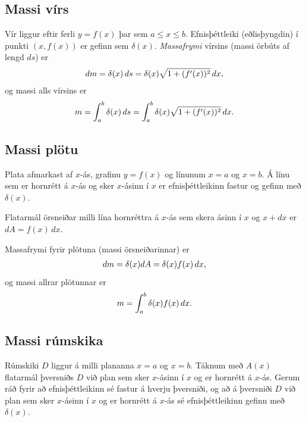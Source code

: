\documentclass[a4paper,10pt,icelandic]{sphinxmanual}
\begin{document}
\subsection{Massi vírs}
\label{kafli07:massi-virs}\label{kafli07:index-10}
Vír liggur eftir ferli \(y=f(x)\) þar sem \(a\leq x\leq b\).
Efnisþéttleiki (eðlisþyngdin) í punkti \((x, f(x))\) er gefinn sem
\(\delta(x)\). \emph{Massafrymi} vírsins (massi örbúts af lengd
\(ds\)) er
\begin{gather}
\begin{split}dm
= \delta(x)\, ds
=\delta(x)\sqrt{1+(f'(x))^2}\, dx,\end{split}\notag
\end{gather}
og massi alls vírsins er
\begin{gather}
\begin{split}m=\int_a^b \delta(x)\,ds=\int_a^b \delta(x)\sqrt{1+(f'(x))^2}\, dx.\end{split}\notag
\end{gather}

\subsection{Massi plötu}
\label{kafli07:id4}\label{kafli07:massi-plotu}\label{kafli07:index-11}
Plata afmarkast af \(x\)-ás, grafinu \(y=f(x)\) og línunum
\(x=a\) og \(x=b\). Á línu sem er hornrétt á \(x\)-ás og
sker \(x\)-ásinn í \(x\) er efnisþéttleikinn fastur og gefinn
með \(\delta(x)\).

Flatarmál örsneiðar milli lína hornréttra á \(x\)-ás sem skera ásinn
í \(x\) og \(x+dx\) er \(dA=f(x)\,dx\).

Massafrymi fyrir plötuna (massi örsneiðarinnar) er
\begin{gather}
\begin{split}dm =\delta(x)dA = \delta(x) f(x)\,dx,\end{split}\notag
\end{gather}
og massi allrar plötunnar er
\begin{gather}
\begin{split}m=\int_a^b \delta(x)f(x)\,dx.\end{split}\notag
\end{gather}

\subsection{Massi rúmskika}
\label{kafli07:massi-rumskika}\label{kafli07:index-12}
Rúmskiki \(D\) liggur á milli plananna \(x=a\) og \(x=b\).
Táknum með \(A(x)\) flatarmál þversniðs \(D\) við plan sem sker
\(x\)-ásinn í \(x\) og er hornrétt á \(x\)-ás. Gerum ráð
fyrir að efnisþéttleikinn sé fastur á hverju þversniði, og að á
þversniði \(D\) við plan sem sker \(x\)-ásinn í \(x\) og er
hornrétt á \(x\)-ás sé efnisþéttleikinn gefinn með
\(\delta(x)\).
\end{document}
